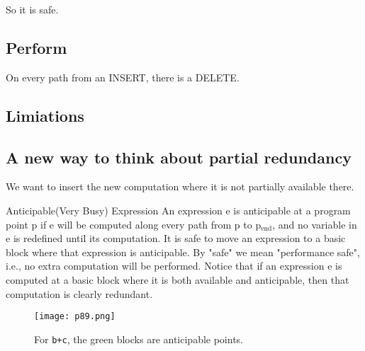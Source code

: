 So it is safe.

\subsection{Perform}
On every path from an INSERT, there is a DELETE.


\subsection{Limiations}




\subsection{A new way to think about partial redundancy}


























We want to insert the new computation where it is not partially available there.


\begin{definition}{Anticipable(Very Busy) Expression}
    An	expression	e	is	anticipable	at	a	program	point	p	
    if	e will	be	computed	along	every	path	from	
    p	to	p$_{\mathrm{end}}$,	and	no	 variable	in	e	is	
    redefined	until	its	computation. It	is	safe	to	move	
    an	expression	to	a	basic	block	where	
    that	expression	is	anticipable. By	"safe"	we	mean	
    "performance	safe",	i.e.,	no	extra computation	
    will	be	performed.	Notice	that	if	an	expression	
    e	is	computed	at	a	basic block	where	it	is	both     available
    and	anticipable,	then	that	
    computation	is	clearly	redundant.		

    \begin{figure}[H]
        \centering
         \texttt{[image: p89.png]}
             \caption{For \texttt{b+c}, the {\color{green}green} blocks are anticipable points. }
             \label{fig:p89}
    \end{figure}
\end{definition}



